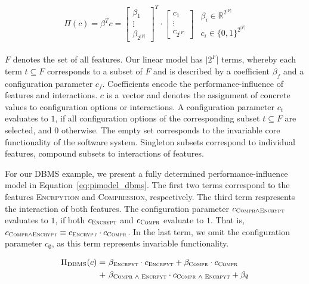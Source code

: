 \documentclass[sigconf, screen]{acmart}
\begin{document}
	\begin{align} \label{eq:pimodel}
	\begin{split}
	\Pi(c) = \beta^T c =  \begin{bmatrix}
	\beta_1\\
	\vdots \\
	\beta_{2^{\vert F\vert}}
	\end{bmatrix}^T \cdot \begin{bmatrix}
	c_1\\
	\vdots \\
	c_{2^{\vert F\vert}}
	\end{bmatrix}
	\end{split}
	\begin{split}
	\beta_i \in \mathbb{R}^{2^{|F|}}\\
	c_i \in \lbrace 0,1\rbrace^{2^{|F|}}
	\end{split}
	\end{align}
	
	$F$ denotes the set of all features. Our linear model has $\vert 2^F\vert$ terms, whereby each term $t \subseteq F$ corresponds to a subset of $F$ and is described by a coefficient $\beta_f$ and a configuration parameter $c_f$.
	Coefficients encode the performance-influence of features and interactions. $c$ is a vector and denotes the assignment of concrete values to configuration options or interactions. A configuration parameter $c_t$ evaluates to $1$, if all configuration options of the corresponding subset $t \subseteq F$ are selected, and $0$ otherwise. The empty set corresponds to the invariable core functionality of the software system. Singleton subsets correspond to individual features, compound subsets to interactions of features.
	
	For our DBMS example, we present a fully determined performance-influence model in Equation~\ref{eq:pimodel_dbms}. The first two terms correspond to the features \textsc{Encrpytion} and \textsc{Compression}, respectively. The third term respresents the interaction of both features. The configuration parameter $c_{\textsc{Compr}\land\textsc{Encrypt}}$ evaluates to $1$, if both $c_{\textsc{Encrypt}}$ and $c_{\textsc{Compr}}$ evaluate to $1$.
	That is, $c_{\textsc{Compr}\land\textsc{Encrypt}} \equiv c_{\textsc{Encrypt}} \cdot c_{\textsc{Compr}}$. In the last term, we omit the configuration parameter $c_\emptyset$, as this term represents invariable functionality.
	
	\begin{align} \label{eq:pimodel_dbms}
	\begin{split}
	\Pi_{\text{DBMS}}(c) =&~\beta_{\textsc{Encrpyt}} \cdot c_{\textsc{Encrpyt}} + \beta_{\textsc{Compr}} \cdot c_{\textsc{Compr}} \\
	+&~ \beta_{\textsc{Compr\ $\land$\ Encrpyt}} \cdot c_{\textsc{Compr\ $\land$\ Encrpyt}}
	+ \beta_{\emptyset}
	\end{split}
	\end{align}
	
\end{document}
